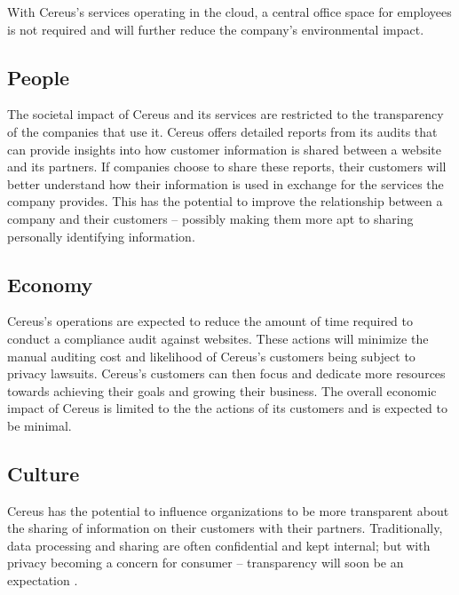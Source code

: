 With Cereus's services operating in the cloud, a central office space for employees is not required and will further reduce the company's environmental impact.

\subsection{People}

The societal impact of Cereus and its services are restricted to the transparency of the companies that use it. Cereus offers detailed reports from its audits that can provide insights into how customer information is shared between a website and its partners. If companies choose to share these reports, their customers will better understand how their information is used in exchange for the services the company provides. This has the potential to improve the relationship between a company and their customers -- possibly making them more apt to sharing personally identifying information.

\subsection{Economy}

Cereus's operations are expected to reduce the amount of time required to conduct a compliance audit against websites. These actions will minimize the manual auditing cost and likelihood of Cereus's customers being subject to privacy lawsuits. Cereus's customers can then focus and dedicate more resources towards achieving their goals and growing their business. The overall economic impact of Cereus is limited to the the actions of its customers and is expected to be minimal.

\subsection{Culture}

Cereus has the potential to influence organizations to be more transparent about the sharing of information on their customers with their partners. Traditionally, data processing and sharing are often confidential and kept internal; but with privacy becoming a concern for consumer -- transparency will soon be an expectation \cite{meehan.forbes.2019}.


